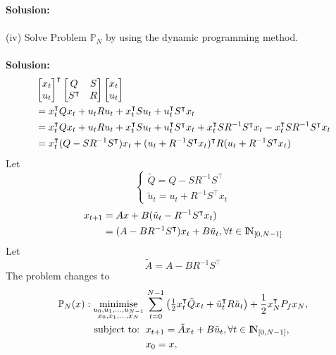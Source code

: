 \documentclass[a4paper,11pt,reqno]{amsart}
\newcommand{\N}{{\rm I\!N}}
\newcommand{\tran}{\intercal}
\DeclareMathOperator*{\minimise}{minimise}
\begin{document}
\textbf{Solusion:}
\\ \\
(iv) Solve Problem $\mathbb{P}_N$ by using the dynamic programming method.
\\ \\
\textbf{Solusion:}
\begin{align}
    &
    \begin{bmatrix}
        x_t\\
        u_t
    \end{bmatrix}^{\tran}
    \begin{bmatrix}
        Q&S\\
        S^{\tran}&R
    \end{bmatrix}
    \begin{bmatrix}
        x_t\\
        u_t
    \end{bmatrix}\notag\\
    &=x_t^{\tran}Qx_t+u_tRu_t+x_t^{\tran}Su_t+u_t^{\tran}S^{\tran}x_t\notag\\
    &=x_t^{\tran}Qx_t+u_tRu_t+x_t^{\tran}Su_t+u_t^{\tran}S^{\tran}x_t+x_t^{\tran}SR^{-1}S^{\tran}x_t-x_t^{\tran}SR^{-1}S^{\tran}x_t\notag\\
    &=x_t^{\tran}(Q-SR^{-1}S^{\tran})x_t+(u_t+R^{-1}S^{\tran}x_t)^{\tran}R(u_t+R^{-1}S^{\tran}x_t)
    \label{eq:P_N_matrix_rewrite}
\end{align}
Let
\begin{equation}
    \begin{cases}
        \tilde{Q}=Q-SR^{-1}S^{\tran}\\
        \tilde{u}_t=u_t+R^{-1}S^{\tran}x_t
    \end{cases}
    \label{eq:tilde_Q_u}
\end{equation}
\begin{align}
    x_{t+1}&=Ax+B(\tilde{u}_t-R^{-1}S^{\tran}x_t)\notag\\
    &=(A-BR^{-1}S^{\tran})x_t+B\tilde{u}_t, \forall t\in\N_{[0, N-1]}
    \label{eq:tilde_x}
\end{align}
Let
\begin{equation}
    \tilde{A}=A-BR^{-1}S^{\tran}
    \label{eq:tilde_A}
\end{equation}
The problem changes to 
\begin{subequations}
    \begin{align}
        \mathbb{P}_N(x): \minimise_{\substack{u_0,u_1,\ldots,u_{N-1}\\ x_0,x_1,\ldots,x_N}} \,
         & \sum_{t=0}^{N-1}\left(\textstyle\frac{1}{2}
         x_t^{\tran}\tilde{Q}x_t+\tilde{u}_t^{\tran}R\tilde{u}_t\right) 
         +\frac{1}{2}x_N^{\tran}P_fx_N,
        \\
        \text{subject to: }\,
         & x_{t+1} = \tilde{A}x_t+B\tilde{u}_t, \forall t\in\N_{[0, N-1]},
        \\
         & x_{0} = x,
    \end{align}
\end{subequations}
\end{document}

